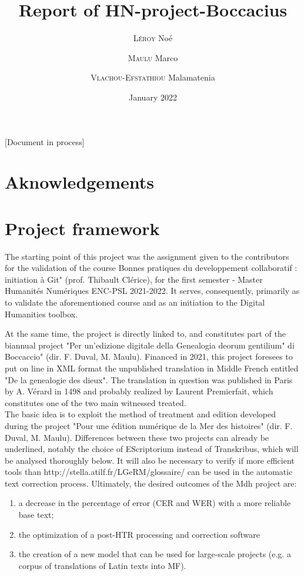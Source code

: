 \documentclass[12pt,twoside]{article}
\begin{document}
[Document in process]

\title{Report of HN-project-Boccacius }
\date{January 2022}
\author{\textsc{Léroy }Noé \and {\textsc{Maulu } Marco}\and {\textsc{Vlachou-Efstathiou } Malamatenia }}

\maketitle

\clearpage

\section{Aknowledgements}



\section{Project framework}

The starting point of this project was the assignment given to the contributors for the validation of the course Bonnes pratiques du developpement collaboratif : initiation à Git" (prof. Thibault Clérice), for the first semester - Master Humanités Numériques ENC-PSL 2021-2022. It serves, consequently, primarily as to validate the aforementioned course and as an  initiation to the Digital Humanities toolbox.

At the same time, the project is directly linked to, and constitutes part of the biannual project "Per un'edizione digitale della Genealogia deorum gentilium" di Boccaccio" (dir. F. Duval, M. Maulu). Financed in 2021, this project foresees to put on line in XML format the unpublished translation in Middle French entitled "De la genealogie des dieux". The translation in question was published in Paris by A. Vérard in 1498 and probably realized by Laurent Premierfait, which constitutes one of the two main witnessed treated.\\

The basic idea is to exploit the method of treatment and edition developed during the project "Pour une édition numérique de la Mer des histoires" (dir. F. Duval, M. Maulu). Differences between these two projects can already be underlined, notably the choice of EScriptorium instead of Transkribus, which will be analysed thoroughly below. 
It will also be necessary to verify if more efficient tools than http://stella.atilf.fr/LGeRM/glossaire/ can be used in the automatic text correction process. 
Ultimately, the desired outcomes of the Mdh project are: 
\begin{enumerate}
    \item a decrease in the percentage of error (CER and WER) with a more reliable base text;
    \item  the optimization of a post-HTR processing and correction software
    \item the creation of a new model that can be used for large-scale projects (e.g. a corpus of translations of Latin texts into MF).
\end{enumerate}
\end{document}
